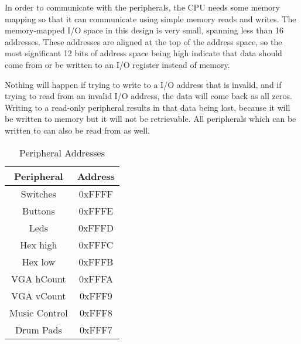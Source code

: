 \documentclass{subfile}
\begin{document}
  In order to communicate with the peripherals, the CPU needs some memory mapping so that it 
  can communicate using simple memory reads and writes.
  The memory-mapped I/O space in this design is very small, spanning less than 16 addresses. 
  These addresses are aligned at the top of the address space, so the most significant 
  12 bits of address space being high indicate that data should come from or be 
  written to an I/O register instead of memory.

  Nothing will happen if trying to write to a I/O address that is invalid, and if trying to 
  read from an invalid I/O address, the data will come back as all zeros.
  Writing to a read-only peripheral results in that data being lost, because it will be 
  written to memory but it will not be retrievable. 
  All peripherals which can be written to can also be read from as well.

  \begin{table}[h]
    \caption{Peripheral Addresses} 
    \label{tab:addrs}
    \centering
    \begin{tabular}{|c|c|}
      \hline 
      Peripheral & Address \\ \hline
      \hline
      Switches & 0xFFFF \\ \hline 
      Buttons & 0xFFFE \\ \hline 
      Leds    & 0xFFFD \\ \hline 
      Hex high & 0xFFFC \\ \hline 
      Hex low & 0xFFFB \\ \hline 
      VGA hCount & 0xFFFA \\ \hline 
      VGA vCount & 0xFFF9 \\ \hline 
      Music Control & 0xFFF8 \\ \hline 
      Drum Pads & 0xFFF7 \\ \hline 
    \end{tabular}
  \end{table}
  
\end{document}

